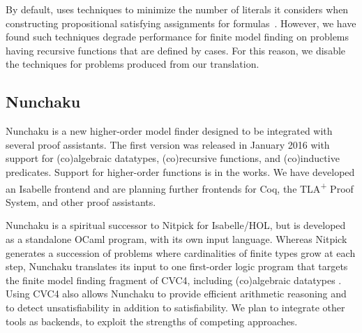 By default, \cvc uses techniques to minimize the number of literals it
considers when constructing propositional satisfying assignments for
formulas~\cite{relevancy2007}. However, we have found such techniques degrade
performance for finite model finding on problems having recursive functions
that are defined by cases. For this reason, we disable the techniques for
problems produced from our translation.



\subsection{Nunchaku}
\label{ssec:nunchaku}

Nunchaku is a new higher-order model finder designed to be integrated with
several proof assistants. The first version was released in January 2016
with support for (co)al\-gebraic datatypes, (co)recursive functions, and
(co)inductive predicates. Support for higher-order functions is in the works.
We have developed an Isabelle frontend and are
planning further frontends for Coq, %
the TLA\textsuperscript{+} Proof System, and other proof assistants.

Nunchaku is a spiritual successor to Nitpick \cite{blanchette-nipkow-2010} for
Isabelle/HOL, but is developed as a standalone
OCaml program, with its own input language. Whereas Nitpick generates a
succession of problems where cardinalities of finite types grow at each step,
Nunchaku translates its input to one first-order logic program that targets
the finite model finding fragment of CVC4, including
(co)algebraic datatypes \cite{reynolds-blanchette-2015-codata}.
Using CVC4 also allows Nunchaku to provide efficient arithmetic
reasoning and to detect unsatisfiability in addition to satisfiability.
We plan to integrate other tools as backends, to exploit the
strengths of competing approaches.

